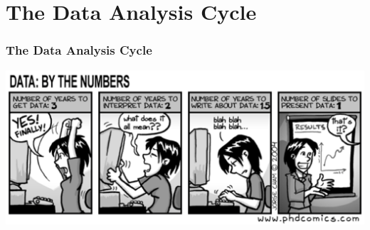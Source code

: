 \documentclass{beamer}
\begin{document}
\section{The Data Analysis Cycle}
\begin{frame}
\frametitle{The Data Analysis Cycle}
\begin{center}
\includegraphics[scale=0.55]{./figures/comic.png}
\end{center}
\end{frame}
\end{document}
